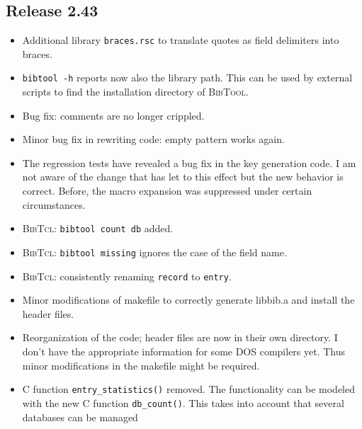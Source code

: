 \documentclass[11pt,a4paper]{scrartcl}
\newcommand\rsc[1]{\texttt{#1}}
\newcommand\File[1]{\textsf{#1}}
\newcommand\BibTool{\textsc{BibTool}}
\newcommand\BibTcl{\textsc{BibTcl}}
\newenvironment{Release}[2]{%
  \def\tmp{#2}%
  \section*{Release #1 \ifx\tmp\empty\else{\normalsize[#2]}\fi}
  \begin{itemize}
}{\end{itemize}}
\newenvironment{Fix}[1]{\item }{}
\newenvironment{New}[1]{\item }{}
\newenvironment{Update}[1]{\item }{}
\begin{document}
\begin{multicols}
 \begin{Release}{2.43}{}
  \begin{New}{gene}
    Additional library \rsc{braces.rsc} to translate quotes as field
    delimiters into braces.
  \end{New}
  \begin{Update}{gene}
    \verb|bibtool -h| reports now also the library path. This can be
    used by external scripts to find the installation directory of
    \BibTool.
  \end{Update}
  \begin{Fix}{gene}
    Bug fix: comments are no longer crippled.
  \end{Fix}
  \begin{Fix}{gene}
    Minor bug fix in rewriting code: empty pattern works again.
  \end{Fix}
  \begin{Fix}{gene}
    The regression tests have revealed a bug fix in the key generation
    code. I am not aware of the change that has let to this effect but
    the new behavior is correct. Before, the macro expansion was
    suppressed under certain circumstances.
  \end{Fix}
  \begin{New}{gene}
    \BibTcl: \verb|bibtool count db| added.
  \end{New}
  \begin{Fix}{gene}
    \BibTcl: \verb|bibtool missing| ignores the case of the field
    name.
  \end{Fix}
  \begin{Update}{gene}
    \BibTcl: consistently renaming \verb|record| to \verb|entry|.
  \end{Update}
  \begin{Fix}{gene}
    Minor modifications of makefile to correctly generate
    \File{libbib.a} and install the header files.
  \end{Fix}
  \begin{Update}{gene}
    Reorganization of the code; header files are now in their own directory. I
    don't have the appropriate information for some DOS compilers yet.
    Thus minor modifications in the makefile might be required.
  \end{Update}
  \begin{New}{gene}
    C function \verb|entry_statistics()| removed. The functionality
    can be modeled with the new C function \verb|db_count()|. This
    takes into account that several databases can be managed

\end{New}
\end{Release}
\end{multicols}
\end{document}
